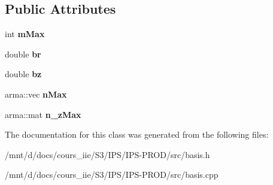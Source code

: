 \subsection*{Public Attributes}
\begin{DoxyCompactItemize}
\item 
int {\bfseries m\+Max}\hypertarget{classBasis_ab6095856207deef6f202fdc127d7c076}{}\label{classBasis_ab6095856207deef6f202fdc127d7c076}

\item 
double {\bfseries br}\hypertarget{classBasis_a2fb4317b2fca047de6e0bdaa393c0fff}{}\label{classBasis_a2fb4317b2fca047de6e0bdaa393c0fff}

\item 
double {\bfseries bz}\hypertarget{classBasis_aba3185c6a7b52abc688bafebd8f8f7ff}{}\label{classBasis_aba3185c6a7b52abc688bafebd8f8f7ff}

\item 
arma\+::vec {\bfseries n\+Max}\hypertarget{classBasis_a5875c842a1271958f75fa9d223c9333e}{}\label{classBasis_a5875c842a1271958f75fa9d223c9333e}

\item 
arma\+::mat {\bfseries n\+\_\+z\+Max}\hypertarget{classBasis_a6024dca693a78c1a0ad98491e67927a1}{}\label{classBasis_a6024dca693a78c1a0ad98491e67927a1}

\end{DoxyCompactItemize}


The documentation for this class was generated from the following files\+:\begin{DoxyCompactItemize}
\item 
/mnt/d/docs/cours\+\_\+iie/\+S3/\+I\+P\+S/\+I\+P\+S-\/\+P\+R\+O\+D/src/basis.\+h\item 
/mnt/d/docs/cours\+\_\+iie/\+S3/\+I\+P\+S/\+I\+P\+S-\/\+P\+R\+O\+D/src/basis.\+cpp\end{DoxyCompactItemize}
